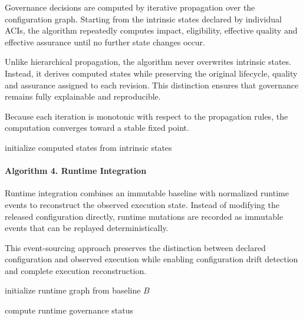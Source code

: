 \documentclass[10pt]{article}
\begin{document}
Governance decisions are computed by iterative propagation over the configuration graph. Starting from the intrinsic states declared by individual ACIs, the algorithm repeatedly computes impact, eligibility, effective quality and effective assurance until no further state changes occur.

Unlike hierarchical propagation, the algorithm never overwrites intrinsic states. Instead, it derives computed states while preserving the original lifecycle, quality and assurance assigned to each revision. This distinction ensures that governance remains fully explainable and reproducible.

Because each iteration is monotonic with respect to the propagation rules, the computation converges toward a stable fixed point.

\begin{algorithm}[H]
\caption{Fixed-Point Governance Propagation}
\label{alg:propagation}

initialize computed states from intrinsic states\;


\end{algorithm}

\paragraph{Algorithm 4. Runtime Integration}

Runtime integration combines an immutable baseline with normalized runtime events to reconstruct the observed execution state. Instead of modifying the released configuration directly, runtime mutations are recorded as immutable events that can be replayed deterministically.

This event-sourcing approach preserves the distinction between declared configuration and observed execution while enabling configuration drift detection and complete execution reconstruction.

\begin{algorithm}[H]
\caption{Runtime Integration}
\label{alg:runtime}

initialize runtime graph from baseline $B$\;


compute runtime governance status\;

\end{algorithm}
\end{document}
